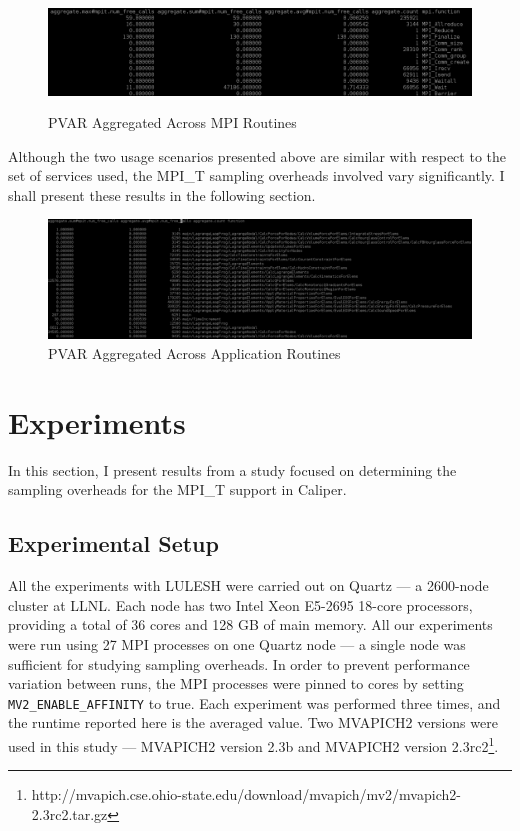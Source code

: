 \begin{center}
	\begin{figure}[tbp!]
         \centering
  \captionsetup{justification=centering}
		\includegraphics[scale=0.8, width=\columnwidth, height=3cm]{figures/CALIPER_MPI_counter_PVAR}
		\caption{PVAR Aggregated Across MPI Routines}
		\label{fig:cali-counter}
	\end{figure}
\end{center}
\par Although the two usage scenarios presented above are similar with respect to the set of services used, the MPI\_T sampling overheads involved vary significantly. I shall present these results in the following section.
\begin{center}
	\begin{figure}[bp!]
         \centering
  \captionsetup{justification=centering}
		\includegraphics[scale=0.8, width=\columnwidth, keepaspectratio]{figures/CALIPER_app_counter_PVAR}
		\caption{PVAR Aggregated Across Application Routines}
		\label{fig:cali-app-counter}
	\end{figure}
\end{center}

\section{Experiments}
In this section, I present results from a study focused on determining the sampling overheads for the MPI\_T support in Caliper.
\subsection{Experimental Setup}
All the experiments with LULESH were carried out on Quartz --- a 2600-node cluster at LLNL. Each node has two Intel Xeon E5-2695 18-core processors, providing a total of 36 cores and 128 GB of main memory. All our experiments were run using 27 MPI processes on one Quartz node --- a single node was sufficient for studying sampling overheads. In order to prevent performance variation between runs, the MPI processes were pinned to cores by setting \verb+MV2_ENABLE_AFFINITY+ to true. Each experiment was performed three times, and the runtime reported here is the averaged value. Two MVAPICH2 versions were used in this study --- MVAPICH2 version 2.3b and MVAPICH2 version 2.3rc2\footnote{http://mvapich.cse.ohio-state.edu/download/mvapich/mv2/mvapich2-2.3rc2.tar.gz}. 
